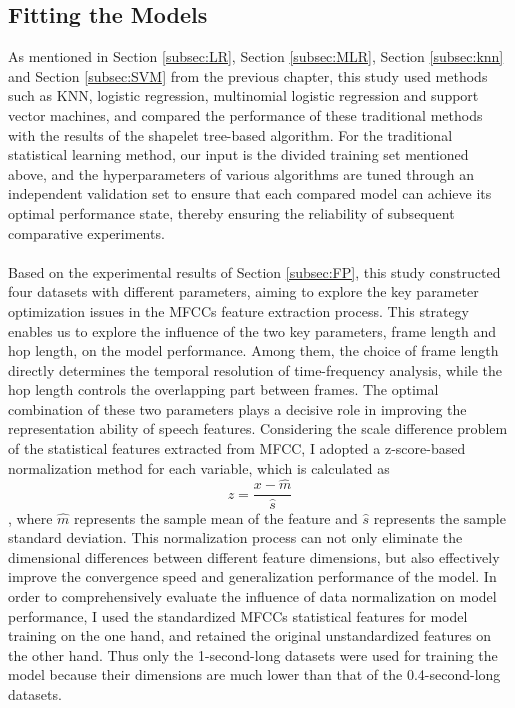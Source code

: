 \subsection{Fitting the Models}\label{subsec:fitting}
As mentioned in Section \ref{subsec:LR}, Section \ref{subsec:MLR}, Section \ref{subsec:knn} and Section \ref{subsec:SVM} from the previous chapter, this study used methods such as KNN, logistic regression, multinomial logistic regression and support vector machines, and compared the performance of these traditional methods with the results of the shapelet tree-based algorithm. For the traditional statistical learning method, our input is the divided training set mentioned above, and the hyperparameters of various algorithms are tuned through an independent validation set to ensure that each compared model can achieve its optimal performance state, thereby ensuring the reliability of subsequent comparative experiments.\\
\\
Based on the experimental results of Section \ref{subsec:FP}, this study constructed four datasets with different parameters, aiming to explore the key parameter optimization issues in the MFCCs feature extraction process. This strategy enables us to explore the influence of the two key parameters, frame length and hop length, on the model performance. Among them, the choice of frame length directly determines the temporal resolution of time-frequency analysis, while the hop length controls the overlapping part between frames. The optimal combination of these two parameters plays a decisive role in improving the representation ability of speech features. Considering the scale difference problem of the statistical features extracted from MFCC, I adopted a z-score-based normalization method for each variable, which is calculated as 
$$z=\frac{x-\hat{m}}{\hat{s}}$$, 
where $\hat{m}$ represents the sample mean of the feature and $\hat{s}$ represents the sample standard deviation. This normalization process can not only eliminate the dimensional differences between different feature dimensions, but also effectively improve the convergence speed and generalization performance of the model. In order to comprehensively evaluate the influence of data normalization on model performance, I used the standardized MFCCs statistical features for model training on the one hand, and retained the original unstandardized features on the other hand. Thus only the 1-second-long datasets were used for training the model because their dimensions are much lower than that of the 0.4-second-long datasets.\\
